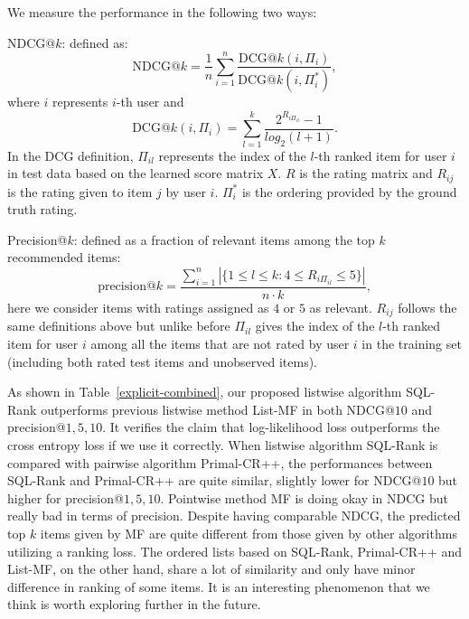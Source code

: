 \documentclass{article}
\begin{document}
We measure the performance in the following two ways:
\begin{compactitem}
    \item NDCG$@k$: defined as:
        \begin{equation*} 
            \text{NDCG}@k = \frac{1}{n} \sum_{i = 1}^{n} \frac{\text{DCG}@k(i, \Pi_i)}{\text{DCG}@k(i, \Pi_i^*)}, 
        \end{equation*} where $i$ represents $i$-th user and
        \begin{equation*} 
        \text{DCG}@k(i, \Pi_i)= \sum_{l = 1}^{k} \frac{2^{R_{i\Pi_{il}}} - 1}{log_2(l + 1)}. 
        \end{equation*}
        In the DCG definition, $\Pi_{il}$ represents the index of the $l$-th ranked item for user $i$ in test data based on the learned score matrix $X$. $R$ is the rating matrix and $R_{ij}$ is the rating given to item $j$ by user $i$. $\Pi_i^*$ is the ordering provided by the ground truth rating.
    \item Precision@$k$: defined as a fraction of relevant items among the top $k$ recommended items: 
        \begin{equation*}
            \text{precision}@k = \frac{\sum_{i=1}^{n}|\{1 \leq l \leq k: 4 \leq R_{i\Pi_{il}} \leq 5\}|}{n \cdot k},
        \end{equation*}
        here we consider items with ratings assigned as $4$ or $5$ as relevant. $R_{ij}$ follows the same definitions above but unlike before $\Pi_{il}$ gives the index of the $l$-th ranked item for user $i$ among all the items that are not rated by user $i$ in the training set (including both rated test items and unobserved items). 
\end{compactitem}


As shown in Table~\ref{explicit-combined}, our proposed listwise algorithm SQL-Rank outperforms previous listwise method List-MF in both NDCG@$10$ and precision@$1,5,10$. It verifies the claim that log-likelihood loss outperforms the cross entropy loss if we use it correctly. When listwise algorithm SQL-Rank is compared with pairwise algorithm Primal-CR++, the performances between SQL-Rank and Primal-CR++ are quite similar, slightly lower for NDCG@$10$ but higher for precision@$1,5,10$. Pointwise method MF is doing okay in NDCG but really bad in terms of precision. %
Despite having comparable NDCG, the predicted top $k$ items given by MF are quite different from those given by other algorithms utilizing a ranking loss. The ordered lists based on SQL-Rank, Primal-CR++ and List-MF, on the other hand, share a lot of similarity and only have minor difference in ranking of some items. It is an interesting phenomenon that we think is worth exploring further in the future. 
\end{document}
